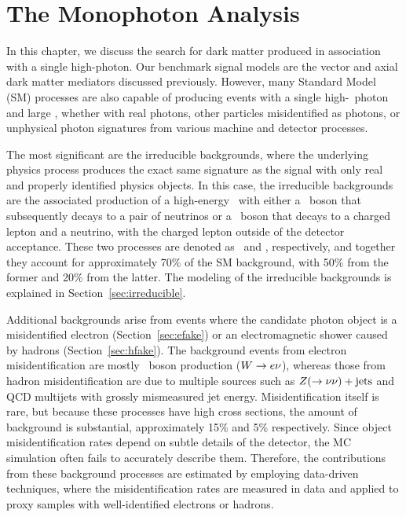 \chapter{The Monophoton Analysis}
\label{chap:analysis}

In this chapter, we discuss the search for dark matter produced in association with a single high-\pt photon.
Our benchmark signal models are the vector and axial dark matter mediators discussed previously. 
However, many Standard Model (SM) processes are also capable of producing events with a single high-\pt\ photon and large \met, whether with real photons, other particles misidentified as photons, or unphysical photon signatures from various  machine and detector processes. 


The most significant are the irreducible backgrounds, where the underlying physics process produces the exact same signature as the signal with only real and properly identified physics objects.
In this case, the irreducible backgrounds are the associated production of a high-energy \Pgg\ with either a \PZ\ boson that subsequently decays to a pair of neutrinos or a \PW\ boson that decays to a charged lepton and a neutrino, with the charged lepton outside of the detector acceptance.
These two processes are denoted as \zinvg\ and \wlng, respectively, and together they account for approximately 70\% of the SM background, with 50\% from the former and 20\% from the latter.
The modeling of the irreducible backgrounds is explained in Section~\ref{sec:irreducible}.

Additional backgrounds arise from events where the candidate photon object is a misidentified electron (Section~\ref{sec:efake}) or an electromagnetic shower caused by hadrons (Section~\ref{sec:hfake}). 
The background events from electron misidentification are mostly \PW\ boson production (${W}\rightarrow {e}\nu$), whereas those from hadron misidentification are due to multiple sources such as ${Z}(\rightarrow\nu\nu)+\text{jets}$ and QCD multijets with grossly mismeasured jet energy. 
Misidentification itself is rare, but because these processes have high cross sections, the amount of background is substantial, approximately 15\% and 5\% respectively.
Since object misidentification rates depend on subtle details of the detector, the MC simulation often fails to accurately describe them.
Therefore, the contributions from these background processes are estimated by employing data-driven techniques, where the misidentification rates are measured in data and applied to proxy samples with well-identified electrons or hadrons.


